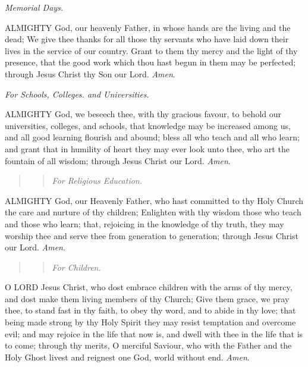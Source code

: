 \emph{Memorial
Days.}

ALMIGHTY
God, our heavenly Father, in whose hands are the living and the dead;
We give thee thanks for all those thy servants who have laid down their
lives in the service of our country. Grant to them thy mercy and the light
of thy presence, that the good work which thou hast begun in them may
be perfected; through Jesus Christ thy Son our Lord. \emph{Amen}.

\emph{For
Schools, Colleges. and Universities}.

ALMIGHTY
God, we beseech thee, with thy gracious favour, to behold our universities,
colleges, and schools, that knowledge may be increased among us, and all
good learning flourish and abound; bless all who teach and all who learn;
and grant that in humility of heart they may ever look unto thee, who
art the fountain of all wisdom; through Jesus Christ our Lord. \emph{Amen}.

\begin{quote}

\begin{quote}

\emph{For
Religious Education.}

\end{quote}

\end{quote}

ALMIGHTY
God, our Heavenly Father, who hast committed to thy Holy Church the care
and nurture of thy children; Enlighten with thy wisdom those who teach
and those who learn; that, rejoicing in the knowledge of thy truth, they
may worship thee and serve thee from generation to generation; through
Jesus Christ our Lord. \emph{Amen}.

\begin{quote}

\begin{quote}

\emph{For
Children.}

\end{quote}

\end{quote}

O
LORD Jesus Christ, who dost embrace children with the arms of thy mercy,
and dost make them living members of thy Church; Give them grace, we pray
thee, to stand fast in thy faith, to obey thy word, and to abide in thy
love; that being made strong by thy Holy Spirit they may resist temptation
and overcome evil; and may rejoice in the life that now is, and dwell
with thee in the life that is to come; through thy merits, O merciful
Saviour, who with the Father and the Holy Ghost livest and reignest one
God, world without end. \emph{Amen}.

